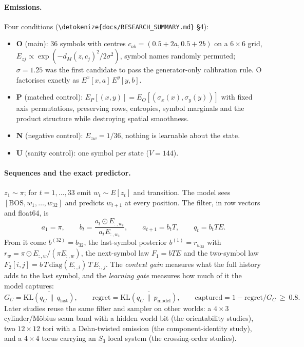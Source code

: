 \documentclass[11pt,a4paper]{article}
\newcommand{\bel}[1]{b^{(#1)}}
\newcommand{\GC}{G_{C}}
\newcommand{\KL}{\mathrm{KL}}
\DeclareRobustCommand{\_}{\ifmmode\origunderscore\else\textunderscore\allowbreak\fi}
\DeclareRobustCommand{\fpath}[1]{\begingroup\small\expandafter\nolinkurl\expandafter{\detokenize{#1}}\endgroup}
\begin{document}
\paragraph{Emissions.}\label{sec:emissions} Four conditions (\fpath{docs/RESEARCH_SUMMARY.md} \S4):
\begin{itemize}
\item \textbf{O} (main): 36 symbols with centres $c_{ab}=(0.5+2a,0.5+2b)$ on a $6\times6$ grid,
$E_{zj}\propto\exp(-d_M(z,c_j)^2/2\sigma^2)$, symbol names randomly permuted; $\sigma=1.25$ was
the first candidate to pass the generator-only calibration rule. O factorises exactly as
$E^x[x,a]\,E^y[y,b]$.
\item \textbf{P} (matched control): $E_P[(x,y)]=E_O[(\sigma_x(x),\sigma_y(y))]$ with fixed axis
permutations, preserving rows, entropies, symbol marginals and the product structure while
destroying spatial smoothness.
\item \textbf{N} (negative control): $E_{zw}=1/36$, nothing is learnable about the state.
\item \textbf{U} (sanity control): one symbol per state ($V=144$).
\end{itemize}

\paragraph{Sequences and the exact predictor.} $z_1\sim\pi$; for $t=1,\dots,33$ emit $w_t\sim E[z_t]$
and transition. The model sees $[\mathrm{BOS},w_1,\dots,w_{32}]$ and predicts $w_{t+1}$ at every
position. The filter, in row vectors and float64, is
\begin{equation}
a_1=\pi,\qquad b_t=\frac{a_t\odot E_{:,w_t}}{a_tE_{:,w_t}},\qquad a_{t+1}=b_tT,\qquad q_t=b_tTE .
\end{equation}
From it come $\bel{32}=b_{32}$, the last-symbol posterior $\bel{1}=r_{w_{32}}$ with
$r_w=\pi\odot E_{:,w}/(\pi E_{:,w})$, the next-symbol law $F_1=bTE$ and the two-symbol law
$F_2[i,j]=b\,T\,\mathrm{diag}(E_{:,i})\,T\,E_{:,j}$. The \emph{context gain} measures what the full
history adds to the last symbol, and the \emph{learning gate} measures how much of it the model
captures:
\begin{equation}
\GC=\overline{\KL(q_C\,\|\,q_{\mathrm{last}})},\qquad
\mathrm{regret}=\overline{\KL(q_C\,\|\,p_{\mathrm{model}})},\qquad
\mathrm{captured}=1-\mathrm{regret}/\GC\ \ge\ 0.8 .
\end{equation}
Later studies reuse the same filter and sampler on other worlds: a $4\times3$ cylinder/M\"obius
seam band with a hidden world bit (the orientability studies), two $12\times12$ tori with a
Dehn-twisted emission (the component-identity study), and a $4\times4$ torus carrying an $S_3$
local system (the crossing-order studies).
\end{document}

